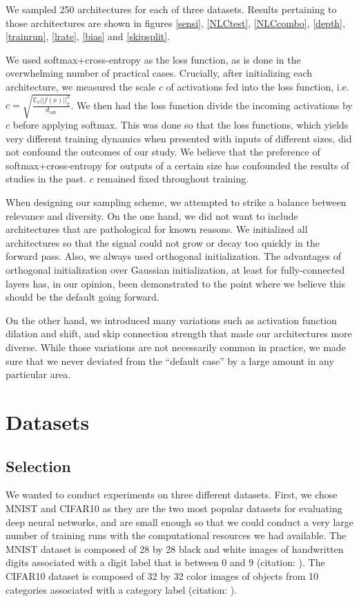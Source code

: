 \documentclass{article} %
\begin{document}
We sampled 250 architectures for each of three datasets. Results pertaining to those architectures are shown in figures \ref{sensi}, \ref{NLCtest}, \ref{NLCcombo}, \ref{depth}, \ref{trainrun}, \ref{lrate}, \ref{bias} and \ref{skipsplit}.

We used softmax+cross-entropy as the loss function, as is done in the overwhelming number of practical cases. Crucially, after initializing each architecture, we measured the scale $c$ of activations fed into the loss function, i.e. $c = \sqrt{\frac{\mathbb{E}_{x} ||f(x)||_2^2}{d_\text{out}}}$. We then had the loss function divide the incoming activations by $c$ before applying softmax. This was done so that the loss functions, which yields very different training dynamics when presented with inputs of different sizes, did not confound the outcomes of our study. We believe that the preference of softmax+cross-entropy for outputs of a certain size has confounded the results of studies in the past. $c$ remained fixed throughout training.

When designing our sampling scheme, we attempted to strike a balance between relevance and diversity. On the one hand, we did not want to include architectures that are pathological for known reasons. We initialized all architectures so that the signal could not grow or decay too quickly in the forward pass. Also, we always used orthogonal initialization. The advantages of orthogonal initialization over Gaussian initialization, at least for fully-connected layers has, in our opinion, been demonstrated to the point where we believe this should be the default going forward. 

On the other hand, we introduced many variations such as activation function dilation and shift, and skip connection strength that made our architectures more diverse. While those variations are not necessarily common in practice, we made sure that we never deviated from the ``default case'' by a large amount in any particular area. 


\section{Datasets} \label{datasetsSection}

\subsection{Selection}

We wanted to conduct experiments on three different datasets. First, we chose MNIST and CIFAR10 as they are the two most popular datasets for evaluating deep neural networks, and are small enough so that we could conduct a very large number of training runs with the computational resources we had available. The MNIST dataset is composed of 28 by 28 black and white images of handwritten digits associated with a digit label that is between 0 and 9 (citation: \citet{MNIST}). The CIFAR10 dataset is composed of 32 by 32 color images of objects from 10 categories associated with a category label (citation: \citet{CIFAR10}).
\end{document}
